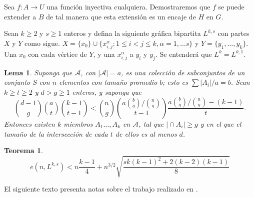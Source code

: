 \documentclass[14pt]{article}
\newtheorem{lema}[section]{Lema}
\newtheorem{theorem}{Teorema}
\begin{document}
  Sea $f: A \rightarrow U$ una función inyectiva cualquiera.
  Demostraremos que $f$ se puede extender a $B$ de tal manera que
  esta extensión es un encaje de $H$ en $G$.

  Sean $k \geq 2$ y $s \geq 1$ enteros y defina la siguiente gráfica
  bipartita $L^{k, s}$ con partes $X$ y $Y$ como sigue. $X = \{x_0\}
  \cup \{x_{i,j}^\alpha: 1 \leq i < j \leq k, \alpha = 1, \ldots s
  \}$ y $Y = \{y_1, \ldots, y_k\}$. Una $x_0$ con cada vértice de
  $Y$, y una $x^{\alpha}_{i, j}$ a $y_i$ y $y_j$. Se entenderá que
  $L^k = L^{k, 1}$.

  \begin{lema}
    Suponga que $\mathcal{A}$, con $\vert \mathcal{A} \vert  = a$, es
    una colección de subconjuntos de un conjunto $S$ con $n$
    elementos con tamaño promedio $b$; esto es
    $\sum \vert A_i \vert / a = b$. Sean $k \geq t \geq 2$ y $d >
     g \geq 1$ enteros, y suponga que
    $$ \binom{d-1}{g} \binom{a}{t} \binom{k-1}{t-1} < \binom{n}{g}
    \binom{ a \binom{b}{g} / \binom{n}{g}}{t - 1} \frac{ a
    \binom{b}{g} / \binom{n}{g} - (k-1)}{t}.$$
    Entonces existen $k$ miembros $A_1 \ldots, A_k$ en $\mathcal{A}$,
    tal que $\vert \cap A_i \vert \geq g$ y en el que el tamaño de la
    intersección de cada $t$ de ellos es al menos $d$. %
  \end{lema}

  \begin{theorem}
    $$e (n, L^{k, s}) < n \frac{k-1}{4} + n^{3/2} \sqrt{\frac{sk (k -
    1)^2 + 2(k - 2)(k-1)}{8}}$$
  \end{theorem}

  El siguiente texto presenta notas sobre el trabajo realizado en
  \cite{furedi1991}.

  \printbibliography
  
\end{document}
